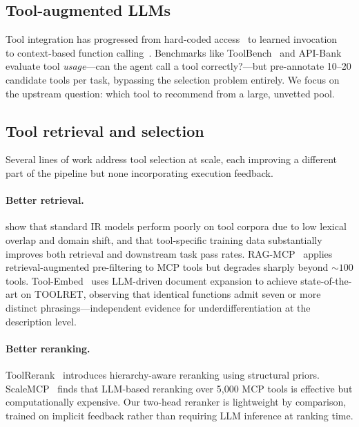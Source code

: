 \documentclass{article}
\begin{document}
\subsection{Tool-augmented LLMs}

Tool integration has progressed from hard-coded access~\citep{yao2023react} to learned invocation~\citep{schick2024toolformer, patil2023gorilla} to context-based function calling~\citep{shen2024hugginggpt}. Benchmarks like ToolBench~\citep{qin2024toolbench} and API-Bank~\citep{li2023apibank} evaluate tool \emph{usage}---can the agent call a tool correctly?---but pre-annotate 10--20 candidate tools per task, bypassing the selection problem entirely. We focus on the upstream question: which tool to recommend from a large, unvetted pool.

\subsection{Tool retrieval and selection}

Several lines of work address tool selection at scale, each improving a different part of the pipeline but none incorporating execution feedback.

\paragraph{Better retrieval.} \citet{shi2024toolret} show that standard IR models perform poorly on tool corpora due to low lexical overlap and domain shift, and that tool-specific training data substantially improves both retrieval and downstream task pass rates. RAG-MCP~\citep{sun2025ragmcp} applies retrieval-augmented pre-filtering to MCP tools but degrades sharply beyond ${\sim}100$ tools. Tool-Embed~\citep{toolembed2026} uses LLM-driven document expansion to achieve state-of-the-art on TOOLRET, observing that identical functions admit seven or more distinct phrasings---independent evidence for underdifferentiation at the description level.

\paragraph{Better reranking.} ToolRerank~\citep{zheng2024toolrerank} introduces hierarchy-aware reranking using structural priors. ScaleMCP~\citep{lumer2025scalemcp} finds that LLM-based reranking over 5,000 MCP tools is effective but computationally expensive. Our two-head reranker is lightweight by comparison, trained on implicit feedback rather than requiring LLM inference at ranking time.
\end{document}
